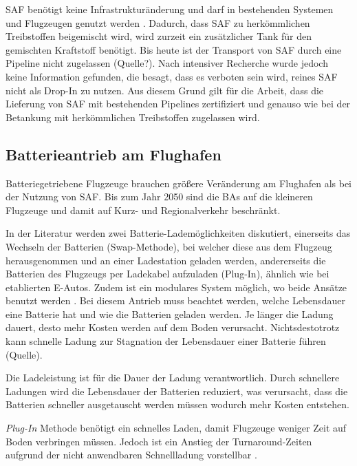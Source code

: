 SAF benötigt keine Infrastrukturänderung und darf in bestehenden Systemen 
und Flugzeugen genutzt werden \cite{dalmia2022powering}.
Dadurch, dass SAF zu herkömmlichen Treibstoffen beigemischt wird, 
wird zurzeit ein zusätzlicher Tank für den gemischten Kraftstoff benötigt. 
Bis heute ist der Transport von SAF durch eine Pipeline nicht zugelassen (Quelle?).
Nach intensiver Recherche wurde jedoch keine Information gefunden, 
die besagt, dass es verboten sein wird, reines SAF nicht als Drop-In zu nutzen. %
Aus diesem Grund gilt für die Arbeit, dass die Lieferung von SAF mit bestehenden Pipelines 
zertifiziert und genauso wie bei der Betankung mit herkömmlichen Treibstoffen zugelassen wird.

\subsection{Batterieantrieb am Flughafen}
Batteriegetriebene Flugzeuge brauchen größere Veränderung am 
Flughafen als bei der Nutzung von SAF.
Bis zum Jahr 2050 sind die BAs auf die kleineren Flugzeuge 
und damit auf Kurz- und Regionalverkehr beschränkt. 

In der Literatur werden zwei Batterie-Lademöglichkeiten diskutiert, 
einerseits das Wechseln der Batterien (Swap-Methode), 
bei welcher diese aus dem Flugzeug herausgenommen und an einer Ladestation geladen werden, 
andererseits die Batterien des Flugzeugs per Ladekabel aufzuladen (Plug-In), 
ähnlich wie bei etablierten E-Autos.
Zudem ist ein modulares System möglich, wo beide Ansätze benutzt werden \cite{salucci2020optimal}.
%
Bei diesem Antrieb muss beachtet werden, 
welche Lebensdauer eine Batterie hat und wie die Batterien geladen werden. 
Je länger die Ladung dauert, desto mehr Kosten werden auf dem Boden verursacht. 
Nichtsdestotrotz kann schnelle Ladung zur Stagnation der Lebensdauer einer Batterie führen (Quelle).

Die Ladeleistung ist für die Dauer der Ladung verantwortlich. 
Durch schnellere Ladungen wird die Lebensdauer der Batterien reduziert,
was verursacht, dass die Batterien schneller ausgetauscht werden 
müssen wodurch mehr Kosten entstehen.

%
\textit{Plug-In} Methode benötigt ein schnelles Laden, 
damit Flugzeuge weniger Zeit auf Boden verbringen müssen.
Jedoch ist ein Anstieg der Turnaround-Zeiten aufgrund der 
nicht anwendbaren Schnellladung vorstellbar \cite{avogadro2024demystifying}. %

